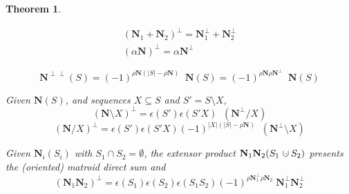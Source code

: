 \documentclass[12pt]{article}
\newtheorem{theorem}{Theorem}[section]
\theoremstyle{definition}
\newcommand{\dunion}
{\mbox{\hbox{\hskip6pt$\cdot$\hskip-5.50pt$\cup$\hskip2pt}}}
\newcommand{\Card}[1]{\ensuremath{{\left|#1\right|}}}
\newcommand{\ext}[1]{\ensuremath{\mathbf{#1}}}
\begin{document}
\begin{theorem}
\label{Identities}
\item
\begin{equation}
\label{LinearityPerp}
\begin{split}
(\ext{N}_1+\ext{N}_2)^\perp = \ext{N}_1^\perp + \ext{N}_2^\perp\\
(\alpha\ext{N})^\perp = \alpha\ext{N}^\perp
\end{split}
\end{equation}

\item
\begin{equation}
\label{PerpPerp}
\ext{N}^{\perp\perp}(S) = (-1)^{\rho\ext{N}(\Card{S}-\rho\ext{N})}\;\;\ext{N}(S)
                        = (-1)^{\rho\ext{N}\rho\ext{N}^\perp}\;\;\ext{N}(S)
\end{equation}

\item
Given $\ext{N}(S)$, and sequences $X\subseteq S$ and $S'=S\setminus X$,
\begin{equation}
\label{DeletePerp}
(\ext{N}\setminus X)^\perp = \epsilon(S')\epsilon(S'X)\;\;(\ext{N}^\perp/X)
\end{equation}
\begin{equation}
\label{ContractPerp}
(\ext{N}/X )^\perp = \epsilon(S')\epsilon(S'X)
(-1)^{\Card{X}(\Card{S}-\rho\ext{N})}\;\;(\ext{N}^\perp\setminus X)
\end{equation}

\item 
Given $\ext{N}_i(S_i)$ with $S_1\cap S_2=\emptyset$, the extensor
product $\ext{N}_1\ext{N}_2(S_1\dunion S_2)$ presents the (oriented)
matroid direct sum and 
\begin{equation}
\label{ProdPerp}
(\ext{N}_1\ext{N}_2)^\perp 
= \epsilon(S_1)\epsilon(S_2)\epsilon(S_1S_2)
(-1)^{\rho\ext{N}_1^\perp\rho\ext{N}_2}\;\ext{N}_1^\perp\ext{N}_2^\perp
\end{equation}
\end{theorem}
\end{document}
